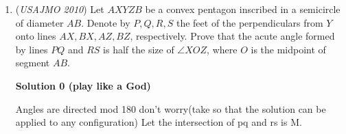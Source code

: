 \begin{enumerate}
\textbf{Solution 3}

We can add $x_1$ to every expression in property (a) to get 
 \[2x_1<x_1+x_2<\dots<x_1+x_{n-1}=2n.\] Therefore, we have $n-2$ distinct (because all the $x_i$ are distinct) expressions of the form $x_1+x_i$ for $i = 1, 2, \dots n-1$ that are all less than $2n$, which means these $n-2$ expressions are also equal to some $x_k$. 

 Now, we have that the $x_i$ are all positive, so $x_1>0$. Adding $x_1$ to both sides, $2x_1>x_1$. Therefore, since the $n-2$ expressions are all at least $2x_1$, they have to be equal to $x_2, x_3, \dots, x_{n-1}$.

 Since there are $n-2$ distinct expressions $x_1+x_i$ equal to $n-2$ distinct expressions $x_j$, we have that each $x_1+x_i$ is equal to one $x_j$. Using the orders of the $x_1+x_i$ and the $x_j$, we find that
 \begin{align*} x_1+x_1 &= x_2 \\ x_1+x_2 &= x_3 \\ ...& \\ x_1+x_{n-2} &= x_{n-1}. \end{align*}
This gives us
 \begin{align*} x_1 &= x_1 \\ x_2 &= 2x_1 \\ x_3 &= 3x_1 \\ &\text{ }...\\ x_{n-1} &= (n-1)x_1\\ \end{align*}
Now, we can use property (b) with $i=1$, so $x_1 + x_{n-1} = 2n$, which means $x_1 = 2$. This gives the sequence 
 \[\boxed{2, 4, 6, \dots, 2(n-1)}\]-sixeoneeight

 


	\item (\textit{USAJMO 2010}) Let $AXYZB$ be a convex pentagon inscribed in a semicircle of diameter $AB$. Denote by $P, Q, R, S$ the feet of the perpendiculars from $Y$ onto lines $AX, BX, AZ, BZ$, respectively. Prove that the acute angle formed by lines $PQ$ and $RS$ is half the size of $\angle XOZ$, where $O$ is the midpoint of segment $AB$.


 



\textbf{Solution 0 (play like a God)}

Angles are directed mod 180 {don't worry}(take so that the solution can be applied to any configuration) Let the intersection of pq and rs is M.


\end{enumerate}
